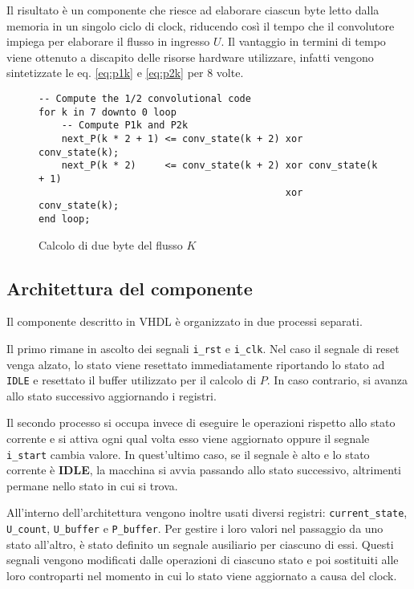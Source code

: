 Il risultato è un componente che riesce ad elaborare ciascun byte letto dalla memoria in un singolo ciclo di clock, riducendo così il tempo che il convolutore impiega per elaborare il flusso in ingresso $U$. Il vantaggio in termini di tempo viene ottenuto a discapito delle risorse hardware utilizzare, infatti vengono sintetizzate le eq. \ref{eq:p1k} e \ref{eq:p2k} per 8 volte.

\begin{figure}[!ht]
    \centering
    \begin{varwidth}{\linewidth}
        \begin{verbatim}
-- Compute the 1/2 convolutional code
for k in 7 downto 0 loop
    -- Compute P1k and P2k
    next_P(k * 2 + 1) <= conv_state(k + 2) xor conv_state(k);
    next_P(k * 2)     <= conv_state(k + 2) xor conv_state(k + 1)
                                           xor conv_state(k);
end loop;
    \end{verbatim}
    \end{varwidth}
    \caption{Calcolo di due byte del flusso $K$}
    \label{code:calcolop}
\end{figure}

\subsection{Architettura del componente}

Il componente descritto in VHDL è organizzato in due processi separati.

Il primo rimane in ascolto dei segnali \verb|i_rst| e \verb|i_clk|. Nel caso il segnale di reset venga alzato, lo stato viene resettato immediatamente riportando lo stato ad \verb|IDLE| e resettato il buffer utilizzato per il calcolo di $P$. In caso contrario, si avanza allo stato successivo aggiornando i registri.

Il secondo processo si occupa invece di eseguire le operazioni rispetto allo stato corrente e si attiva ogni qual volta esso viene aggiornato oppure il segnale \verb|i_start| cambia valore. In quest'ultimo caso, se il segnale è alto e lo stato corrente è \textbf{IDLE}, la macchina si avvia passando allo stato successivo, altrimenti permane nello stato in cui si trova.

All'interno dell'architettura vengono inoltre usati diversi registri: \verb|current_state|, \verb|U_count|, \verb|U_buffer| e \verb|P_buffer|. Per gestire i loro valori nel passaggio da uno stato all'altro, è stato definito un segnale ausiliario per ciascuno di essi. Questi segnali vengono modificati dalle operazioni di ciascuno stato e poi sostituiti alle loro controparti nel momento in cui lo stato viene aggiornato a causa del clock.